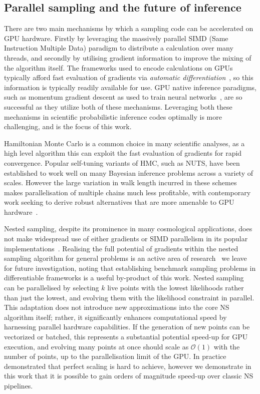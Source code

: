 \documentclass[twocolumn]{openjournal}
\begin{document}
\subsection{Parallel sampling and the future of inference}\label{samplerparall}

There are two main mechanisms by which a sampling code can be accelerated on GPU hardware. Firstly by leveraging the massively parallel SIMD (Same Instruction Multiple Data) paradigm to distribute a calculation over many threads, and secondly by utilising gradient information to improve the mixing of the algorithm itself. The frameworks used to encode calculations on GPUs typically afford fast evaluation of gradients via \emph{automatic differentiation}~\citep{jax2018github}, so this information is typically readily available for use. GPU native inference paradigms, such as momentum gradient descent as used to train neural networks~\citep{kingma2017adammethodstochasticoptimization}, are so successful as they utilize both of these mechanisms. Leveraging both these mechanisms in scientific probabilistic inference codes optimally is more challenging, and is the focus of this work.

Hamiltonian Monte Carlo is a common choice in many scientific analyses, as a high level algorithm this can exploit the fast evaluation of gradients for rapid convergence. Popular self-tuning variants of HMC, such as NUTS, have been established to work well on many Bayesian inference problems across a variety of scales. However the large variation in walk length incurred in these schemes makes parallelisation of multiple chains much less profitable, with contemporary work seeking to derive robust alternatives that are more amenable to GPU hardware~\citep{hoffman_tuning-free_2022,hoffman_adaptive-mcmc_2021}. 

Nested sampling, despite its prominence in many cosmological applications, does not make widespread use of either gradients or SIMD parallelism in its popular implementations~\citep{polychord, buchner2021ultranestrobustgeneral, Speagle_2020, albert2020jaxnshighperformancenestedsampling}. Realising the full potential of gradients within the nested sampling algorithm for general problems is an active area of research~\citep{betancourt_nested_2011,lemos_improving_2023, Cai_2022} we leave for future investigation, noting that establishing benchmark sampling problems in differentiable frameworks is a useful by-product of this work. Nested sampling can be parallelised by selecting $k$ live points with the lowest likelihoods rather than just the lowest, and evolving them with the likelihood constraint in parallel. This adaptation does not introduce new approximations into the core NS algorithm itself; rather, it significantly enhances computational speed by harnessing parallel hardware capabilities. If the generation of new points can be vectorized or batched, this represents a substantial potential speed-up for GPU execution, and evolving many points at once should scale as $\mathcal{O}(1)$ with the number of points, up to the parallelisation limit of the GPU. In practice~\cite{NSSyallup} demonstrated that perfect scaling is hard to achieve, however we demonstrate in this work that it is possible to gain orders of magnitude speed-up over classic NS pipelines.
\end{document}
